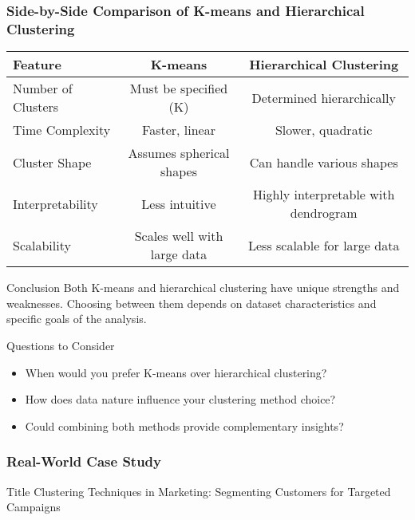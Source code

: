 \documentclass[aspectratio=169]{beamer}
\begin{document}
\begin{frame}[fragile]
    \frametitle{Side-by-Side Comparison of K-means and Hierarchical Clustering}

    \begin{table}[ht]
        \centering
        \begin{tabular}{|l|c|c|}
        \hline
        \textbf{Feature} & \textbf{K-means} & \textbf{Hierarchical Clustering} \\
        \hline
        Number of Clusters & Must be specified (K) & Determined hierarchically \\
        Time Complexity & Faster, linear & Slower, quadratic \\
        Cluster Shape & Assumes spherical shapes & Can handle various shapes \\
        Interpretability & Less intuitive & Highly interpretable with dendrogram \\
        Scalability & Scales well with large data & Less scalable for large data \\
        \hline
        \end{tabular}
    \end{table}
    
    \begin{block}{Conclusion}
        Both K-means and hierarchical clustering have unique strengths and weaknesses. Choosing between them depends on dataset characteristics and specific goals of the analysis.
    \end{block}

    \begin{block}{Questions to Consider}
        \begin{itemize}
            \item When would you prefer K-means over hierarchical clustering?
            \item How does data nature influence your clustering method choice?
            \item Could combining both methods provide complementary insights?
        \end{itemize}
    \end{block}
\end{frame}

\begin{frame}[fragile]
    \frametitle{Real-World Case Study}
    \begin{block}{Title}
        Clustering Techniques in Marketing: Segmenting Customers for Targeted Campaigns
    \end{block}
\end{frame}
\end{document}
